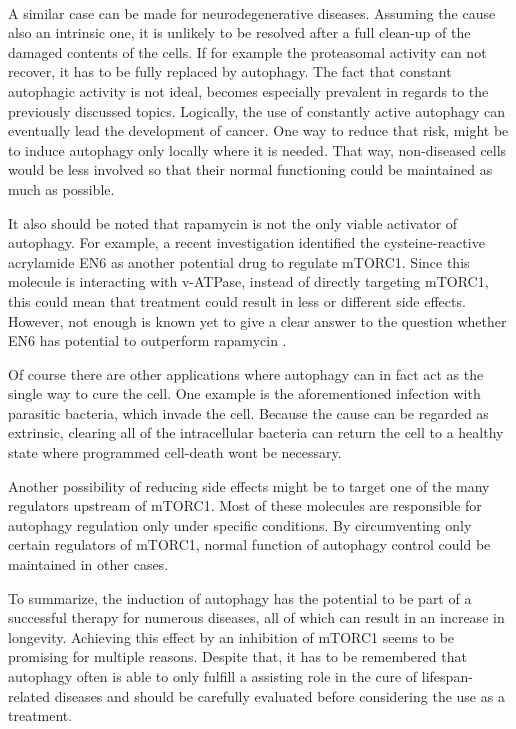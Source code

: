 \documentclass[12pt]{article} %
\begin{document}
\begin{linenumbers*}
\paragraph{} A similar case can be made for neurodegenerative diseases. Assuming the cause also an intrinsic one, it is unlikely to be resolved after a full clean-up of the damaged contents of the cells. If for example the proteasomal activity can not recover, it has to be fully replaced by autophagy. The fact that constant autophagic activity is not ideal, becomes especially prevalent in regards to the previously discussed topics. Logically, the use of constantly active autophagy can eventually lead the development of cancer. One way to reduce that risk, might be to induce autophagy only locally where it is needed. That way, non-diseased cells would be less involved so that their normal functioning could be maintained as much as possible.

It also should be noted that rapamycin is not the only viable activator of autophagy. For example, a recent investigation identified the cysteine-reactive acrylamide EN6 as another potential drug to regulate mTORC1. Since this molecule is interacting with v-ATPase, instead of directly targeting mTORC1, this could mean that treatment could result in less or different side effects. However, not enough is known yet to give a clear answer to the question whether EN6 has potential to outperform rapamycin \citep{Chung2019}.

Of course there are other applications where autophagy can in fact act as the single way to cure the cell. One example is the aforementioned infection with parasitic bacteria, which invade the cell. Because the cause can be regarded as extrinsic, clearing all of the intracellular bacteria can return the cell to a healthy state where programmed cell-death wont be necessary.

Another possibility of reducing side effects might be to target one of the many regulators upstream of mTORC1. Most of these molecules are responsible for autophagy regulation only under specific conditions. By circumventing only certain regulators of mTORC1, normal function of autophagy control could be maintained in other cases.

To summarize, the induction of autophagy has the potential to be part of a successful therapy for numerous diseases, all of which can result in an increase in longevity. Achieving this effect by an inhibition of mTORC1 seems to be promising for multiple reasons. Despite that, it has to be remembered that autophagy often is able to only fulfill a assisting role in the cure of lifespan-related diseases and should be carefully evaluated before considering the use as a treatment.

\end{linenumbers*}
\end{document}

